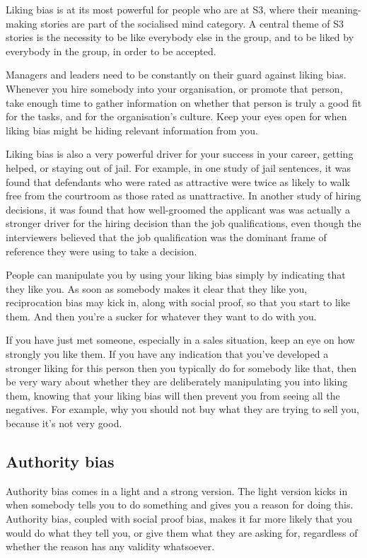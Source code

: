 Liking bias is at its most powerful for people who are at S3, where their meaning\hyp{}making stories are part of the socialised mind category. A central theme of S3 stories is the necessity to be like everybody else in the group, and to be liked by everybody in the group, in order to be accepted.


Managers and leaders need to be constantly on their guard against liking bias. Whenever you hire somebody into your organisation, or promote that person, take enough time to gather information on whether that person is truly a good fit for the tasks, and for the organisation's culture. Keep your eyes open for when liking bias might be hiding relevant information from you.


Liking bias is also a very powerful driver for your success in your career, getting helped, or staying out of jail. For example, in one study of jail sentences, it was found that defendants who were rated as attractive were twice as likely to walk free from the courtroom as those rated as unattractive. In another study of hiring decisions, it was found that how well-groomed the applicant was was actually a stronger driver for the hiring decision than the job qualifications, even though the interviewers believed that the job qualification was the dominant frame of reference  they were using to take a decision.


People can manipulate you by using your liking bias simply by indicating that they like you. As soon as somebody makes it clear that they like you, reciprocation bias may kick in, along with social proof, so that you start to like them. And then you're a sucker for whatever they want to do with you.


If you have just met someone, especially in a sales situation, keep an eye on how strongly you like them. If you have any indication that you've developed a stronger liking for this person then you typically do for somebody like that, then be very wary about whether they are deliberately manipulating you into liking them, knowing that your liking bias will then prevent you from seeing all the negatives. For example, why you should not buy what they are trying to sell you, because it's not very good.
\subsection{Authority bias}
Authority bias comes in a light and a strong version. The light version kicks in when somebody tells you to do something and gives you a reason for doing this. Authority bias, coupled with social proof bias, makes it far more likely that you would do what they tell you, or give them what they are asking for, regardless of whether the reason has any validity whatsoever.



